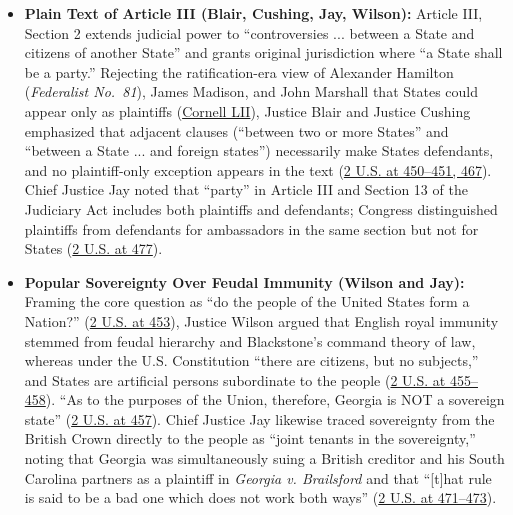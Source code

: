 \documentclass[12pt]{article}
\begin{document}
\begin{itemize}
  \item \textbf{Plain Text of Article III (Blair, Cushing, Jay, Wilson):} Article III, Section 2 extends judicial power to ``controversies ... between a State and citizens of another State'' and grants original jurisdiction where ``a State shall be a party.'' Rejecting the ratification-era view of Alexander Hamilton (\emph{Federalist No.~81}), James Madison, and John Marshall that States could appear only as plaintiffs (\href{https://www.law.cornell.edu/constitution-conan/amendment-11/historical-background-on-eleventh-amendment}{Cornell LII}), Justice Blair and Justice Cushing emphasized that adjacent clauses (``between two or more States'' and ``between a State ... and foreign states'') necessarily make States defendants, and no plaintiff-only exception appears in the text (\href{https://supreme.justia.com/cases/federal/us/2/419/}{2 U.S. at 450--451, 467}). Chief Justice Jay noted that ``party'' in Article III and Section 13 of the Judiciary Act includes both plaintiffs and defendants; Congress distinguished plaintiffs from defendants for ambassadors in the same section but not for States (\href{https://supreme.justia.com/cases/federal/us/2/419/}{2 U.S. at 477}).
  \item \textbf{Popular Sovereignty Over Feudal Immunity (Wilson and Jay):} Framing the core question as ``do the people of the United States form a Nation?'' (\href{https://supreme.justia.com/cases/federal/us/2/419/}{2 U.S. at 453}), Justice Wilson argued that English royal immunity stemmed from feudal hierarchy and Blackstone's command theory of law, whereas under the U.S. Constitution ``there are citizens, but no subjects,'' and States are artificial persons subordinate to the people (\href{https://supreme.justia.com/cases/federal/us/2/419/}{2 U.S. at 455--458}). ``As to the purposes of the Union, therefore, Georgia is NOT a sovereign state'' (\href{https://supreme.justia.com/cases/federal/us/2/419/}{2 U.S. at 457}). Chief Justice Jay likewise traced sovereignty from the British Crown directly to the people as ``joint tenants in the sovereignty,'' noting that Georgia was simultaneously suing a British creditor and his South Carolina partners as a plaintiff in \emph{Georgia v. Brailsford} and that ``[t]hat rule is said to be a bad one which does not work both ways'' (\href{https://supreme.justia.com/cases/federal/us/2/419/}{2 U.S. at 471--473}).

\end{itemize}
\end{document}
